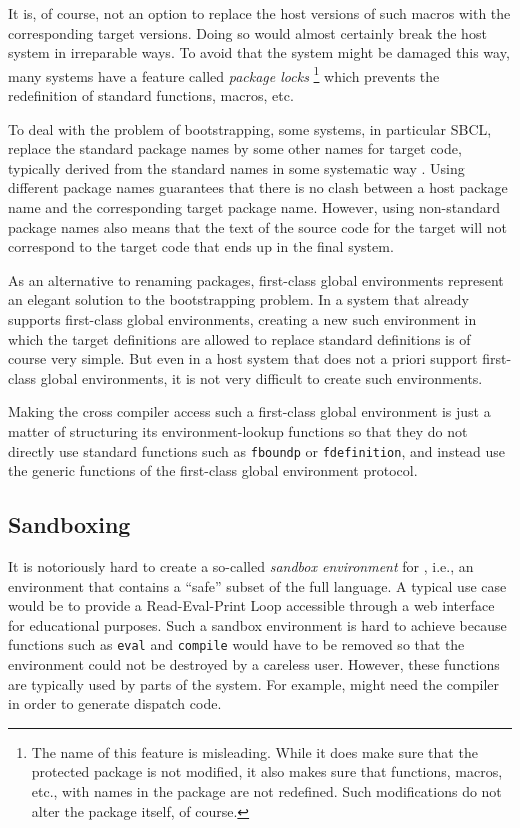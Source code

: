It is, of course, not an option to replace the host versions of such
macros with the corresponding target versions.  Doing so would almost
certainly break the host system in irreparable ways.  To avoid that
the system might be damaged this way,
many \commonlisp{} systems have a feature called \emph{package locks}%
\footnote{The name of this feature is misleading.  While it does make
  sure that the protected package is not modified, it also makes sure
  that functions, macros, etc., with names in the package are not
  redefined.  Such modifications do not alter the package itself, of
  course.}
which prevents the redefinition of standard \commonlisp{} functions,
macros, etc.

To deal with the problem of bootstrapping, some systems, in particular
SBCL, replace the standard package names by some other names for
target code, typically derived from the standard names in some
systematic way \cite{Rhodes:2008:SSC:1482373.1482380}.  Using
different package names guarantees that there is no clash between a
host package name and the corresponding target package name.  However,
using non-standard package names also means that the text of the
source code for the target will not correspond to the target code that
ends up in the final system.

As an alternative to renaming packages, first-class global
environments represent an elegant solution to the bootstrapping
problem.  In a system that already supports first-class global
environments, creating a new such environment in which the target
definitions are allowed to replace standard \commonlisp{} definitions
is of course very simple.  But even in a host system that does not a
priori support first-class global environments, it is not very
difficult to create such environments.

Making the cross compiler access such a first-class global environment
is just a matter of structuring its environment-lookup functions so
that they do not directly use standard \commonlisp{} functions such as
\texttt{fboundp} or \texttt{fdefinition}, and instead use the generic
functions of the first-class global environment protocol.

\subsection{Sandboxing}

It is notoriously hard to create a so-called \emph{sandbox
  environment} for \commonlisp{}, i.e., an environment that contains a
``safe'' subset of the full language.  A typical use case would be to
provide a Read-Eval-Print Loop accessible through a web interface for
educational purposes.  Such a sandbox environment is hard to achieve
because functions such as \texttt{eval} and \texttt{compile} would
have to be removed so that the environment could not be destroyed by a
careless user.  However, these functions are typically used by parts
of the system.  For example, \clos{} might need the compiler in order
to generate dispatch code.

